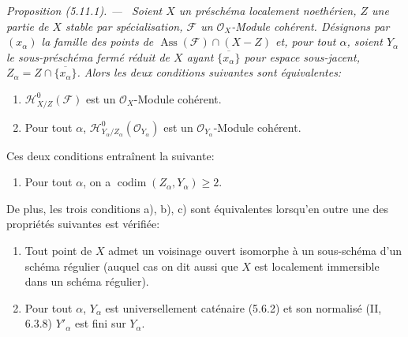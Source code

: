 \documentclass[10pt,oneside]{book}
\newenvironment{proposition}[1][]{%
  \par\medskip\noindent\itshape Proposition (#1). ---\ }{\par}
\begin{document}
\begin{proposition}[5.11.1]
\label{IV.2.s5.11.1-fr}
Soient $X$ un préschéma localement noethérien, $Z$ une partie de $X$ stable par
spécialisation, $\mathcal F$ un $\mathcal O_X$-Module cohérent. Désignons par
$(x_\alpha)$ la famille des points de
$\operatorname{Ass}(\mathcal F)\cap(X-Z)$ et, pour tout $\alpha$, soient
$Y_\alpha$ le sous-préschéma fermé réduit de $X$ ayant
$\overline{\{x_\alpha\}}$ pour espace sous-jacent,
$Z_\alpha=Z\cap\overline{\{x_\alpha\}}$. Alors les deux conditions suivantes
sont équivalentes:
\begin{enumerate}
\item[a)] $\mathcal H^0_{X/Z}(\mathcal F)$ est un $\mathcal O_X$-Module
cohérent.
\item[b)] Pour tout $\alpha$,
$\mathcal H^0_{Y_\alpha/Z_\alpha}(\mathcal O_{Y_\alpha})$ est un
$\mathcal O_{Y_\alpha}$-Module cohérent.
\end{enumerate}
Ces deux conditions entraînent la suivante:
\begin{enumerate}
\item[c)] Pour tout $\alpha$, on a
$\operatorname{codim}(Z_\alpha,Y_\alpha)\geq2$.
\end{enumerate}
De plus, les trois conditions a), b), c) sont équivalentes lorsqu'en outre une
des propriétés suivantes est vérifiée:
\begin{enumerate}
\item[(i)] Tout point de $X$ admet un voisinage ouvert isomorphe à un
sous-schéma d'un schéma régulier (auquel cas on dit aussi que $X$ est
localement immersible dans un schéma régulier).
\item[(ii)] Pour tout $\alpha$, $Y_\alpha$ est universellement caténaire
(5.6.2) et son normalisé (II, 6.3.8) $Y'_\alpha$ est fini sur $Y_\alpha$.
\end{enumerate}
\end{proposition}
\end{document}
